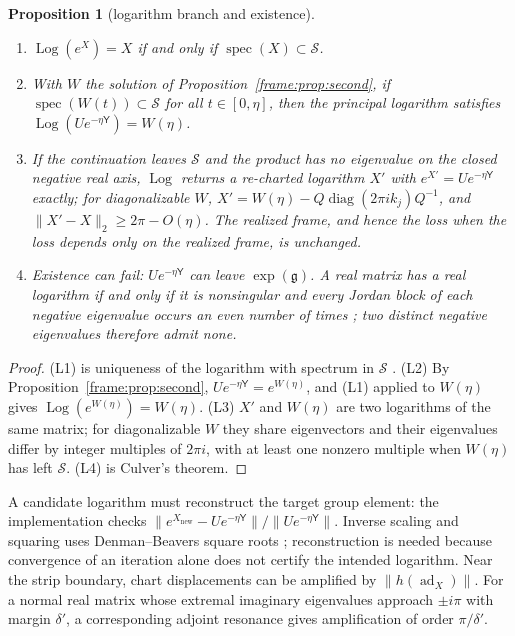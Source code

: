 \documentclass[11pt]{article}
\newtheorem{proposition}[theorem]{Proposition}
\theoremstyle{definition}
\theoremstyle{remark}
\providecommand{\ad}{\operatorname{ad}}
\providecommand{\g}{\mathfrak{g}}
\providecommand{\Log}{\operatorname{Log}}
\providecommand{\spec}{\operatorname{spec}}
\begin{document}
\begin{proposition}[logarithm branch and existence]\label{frame:prop:branch}
\begin{enumerate}
\item[(L1)] $\Log(e^X)=X$ if and only if $\spec(X)\subset\mathcal{S}$.
\item[(L2)] With $W$ the solution of Proposition~\ref{frame:prop:second}, if $\spec(W(t))\subset\mathcal{S}$ for all $t\in[0,\eta]$, then the principal logarithm satisfies $\Log(Ue^{-\eta\mathsf{Y}})=W(\eta)$.
\item[(L3)] If the continuation leaves $\mathcal{S}$ and the product has no eigenvalue on the closed negative real axis, $\Log$ returns a re-charted logarithm $X'$ with $e^{X'}=Ue^{-\eta\mathsf{Y}}$ exactly; for diagonalizable $W$, $X'=W(\eta)-Q\operatorname{diag}(2\pi ik_j)Q^{-1}$, and $\|X'-X\|_2\ge2\pi-O(\eta)$. The realized frame, and hence the loss when the loss depends only on the realized frame, is unchanged.
\item[(L4)] Existence can fail: $Ue^{-\eta\mathsf{Y}}$ can leave $\exp(\g)$. A real matrix has a real logarithm if and only if it is nonsingular and every Jordan block of each negative eigenvalue occurs an even number of times \cite{frame:Culver1966}; two distinct negative eigenvalues therefore admit none.
\end{enumerate}
\end{proposition}
\begin{proof}
(L1) is uniqueness of the logarithm with spectrum in $\mathcal{S}$ \cite[Thm.~1.31]{frame:Higham2008}. (L2) By Proposition~\ref{frame:prop:second}, $Ue^{-\eta\mathsf{Y}}=e^{W(\eta)}$, and (L1) applied to $W(\eta)$ gives $\Log(e^{W(\eta)})=W(\eta)$. (L3) $X'$ and $W(\eta)$ are two logarithms of the same matrix; for diagonalizable $W$ they share eigenvectors and their eigenvalues differ by integer multiples of $2\pi i$, with at least one nonzero multiple when $W(\eta)$ has left $\mathcal{S}$. (L4) is Culver's theorem.
\end{proof}

A candidate logarithm must reconstruct the target group element: the implementation checks \(\|e^{X_{\mathrm{new}}}-Ue^{-\eta\mathsf{Y}}\|/\|Ue^{-\eta\mathsf{Y}}\|\). Inverse scaling and squaring uses Denman--Beavers square roots \cite{frame:DenmanBeavers1976}; reconstruction is needed because convergence of an iteration alone does not certify the intended logarithm. Near the strip boundary, chart displacements can be amplified by \(\|h(\ad_X)\|\). For a normal real matrix whose extremal imaginary eigenvalues approach \(\pm i\pi\) with margin \(\delta'\), a corresponding adjoint resonance gives amplification of order \(\pi/\delta'\).
\end{document}
